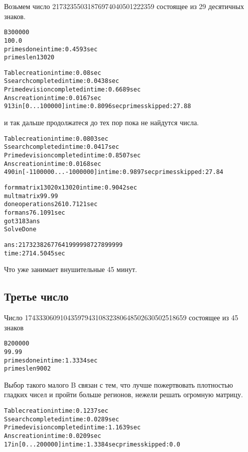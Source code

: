 Возьмем число 21732355031876974040501222359 состоящее из 29 десятичных знаков.

\begin{alltt}
B 300000
100.0 %
primes done in time: 0.4593 sec
primes len 13020
\end{alltt}

\begin{alltt}
Table creation in time: 0.08 sec
S search completed in time: 0.0438 sec
Prime devision completed in time: 0.6689 sec
Ans creation in time: 0.0167 sec
913 in [0...100000] in time: 0.8096 sec primes skipped: 27.88 %
\end{alltt}

и так дальше продолжатеся до тех пор пока не найдутся числа.

\begin{alltt}
Table creation in time: 0.0803 sec
S search completed in time: 0.0417 sec
Prime devision completed in time: 0.8507 sec
Ans creation in time: 0.0168 sec
490 in [-1100000...-1000000] in time: 0.9897 sec primes skipped: 27.84 %
\end{alltt}

\begin{alltt}
form matrix 13020 x 13020 in time: 0.9042 sec
mult matrix 99.99 %
done operations 2610.7121 sec
form ans 76.1091 sec
got 3183 ans
Solve Done

ans: 21732382677641 999998727899999
time: 2714.5045 sec
\end{alltt}

Что уже занимает внушительные 45 минут.

\subsection{Третье число}

Число 1743330609104359794310832380648502630502518659 состоящее из 45 знаков

\begin{alltt}
B 200000
99.99 %
primes done in time: 1.3334 sec
primes len 9002
\end{alltt}

Выбор такого малого B связан с тем, что лучше пожертвовать плотностью гладких чисел и пройти больше регионов, нежели решать огромную матрицу.

\begin{alltt}
Table creation in time: 0.1237 sec
S search completed in time: 0.0289 sec
Prime devision completed in time: 1.1639 sec
Ans creation in time: 0.0209 sec
17 in [0...200000] in time: 1.3384 sec primes skipped: 0.0 %
\end{alltt}

